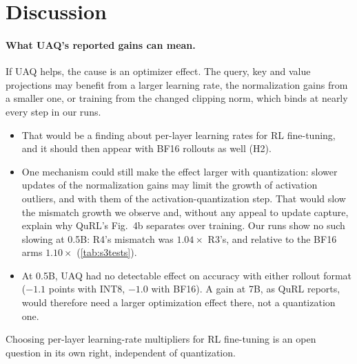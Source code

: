\section{Discussion}\label{sec:discussion}

\paragraph{What UAQ's reported gains can mean.} If UAQ helps, the cause is an optimizer effect. The query, key and value projections may benefit from a larger learning rate, the normalization gains from a smaller one, or training from the changed clipping norm, which binds at nearly every step in our runs.
\begin{itemize}[leftmargin=*,itemsep=1pt]
\item That would be a finding about per-layer learning rates for RL fine-tuning, and it should then appear with BF16 rollouts as well (H2).
\item One mechanism could still make the effect larger with quantization: slower updates of the normalization gains may limit the growth of activation outliers, and with them of the activation-quantization step. That would slow the mismatch growth we observe and, without any appeal to update capture, explain why QuRL's Fig.~4b separates over training. Our runs show no such slowing at 0.5B: R4's mismatch was $1.04\times$ R3's, and relative to the BF16 arms $1.10\times$ (\cref{tab:s3tests}).
\item At 0.5B, UAQ had no detectable effect on accuracy with either rollout format ($-1.1$ points with INT8, $-1.0$ with BF16). A gain at 7B, as QuRL reports, would therefore need a larger optimization effect there, not a quantization one.
\end{itemize}
Choosing per-layer learning-rate multipliers for RL fine-tuning is an open question in its own right, independent of quantization.

